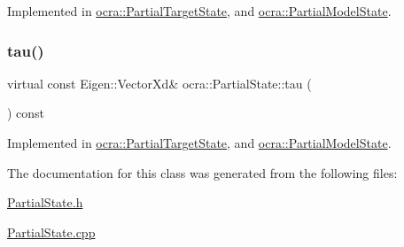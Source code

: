 Implemented in \hyperlink{classocra_1_1PartialTargetState_a9442a4f1c0827a20b6d6582dcceff88a}{ocra\+::\+Partial\+Target\+State}, and \hyperlink{classocra_1_1PartialModelState_a8707827d456a8c406d95c1cd4fc2e0b7}{ocra\+::\+Partial\+Model\+State}.

\hypertarget{classocra_1_1PartialState_a875575d215c7fe9278d47ff6f392bb84}{}\label{classocra_1_1PartialState_a875575d215c7fe9278d47ff6f392bb84} 
\subsubsection{\texorpdfstring{tau()}{tau()}}
{\footnotesize\ttfamily virtual const Eigen\+::\+Vector\+Xd\& ocra\+::\+Partial\+State\+::tau (\begin{DoxyParamCaption}{ }\end{DoxyParamCaption}) const\hspace{0.3cm}{\ttfamily [pure virtual]}}



Implemented in \hyperlink{classocra_1_1PartialTargetState_ac76855da54cf77b63bdbd7ecdb6ef57d}{ocra\+::\+Partial\+Target\+State}, and \hyperlink{classocra_1_1PartialModelState_a286258284aa61c902106a6b0fcdde9ca}{ocra\+::\+Partial\+Model\+State}.



The documentation for this class was generated from the following files\+:\begin{DoxyCompactItemize}
\item 
\hyperlink{PartialState_8h}{Partial\+State.\+h}\item 
\hyperlink{PartialState_8cpp}{Partial\+State.\+cpp}\end{DoxyCompactItemize}
